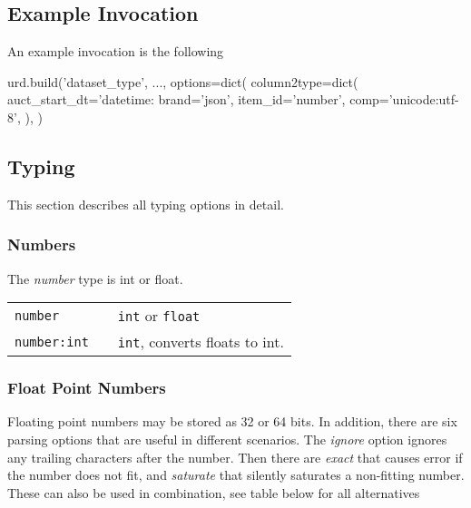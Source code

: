 


\subsection{Example Invocation}
An example invocation is the following

\begin{python}
urd.build('dataset_type', ...,
  options=dict(
    column2type=dict(
      auct_start_dt='datetime:%
      brand='json',
      item_id='number',
      comp='unicode:utf-8',
    ),
  )
\end{python}


\clearpage
\subsection{Typing}
This section describes all typing options in detail.

\subsubsection{Numbers}
The \emph{number} type is int or float.\\

\begin{tabular}{p{2cm}p{2cm}l}
  \texttt{number}     && \texttt{int} or \texttt{float}\\
  \texttt{number:int} && \texttt{int}, converts floats to int.\\
\end{tabular}



\subsubsection{Float Point Numbers}
Floating point numbers may be stored as 32 or 64 bits.  In addition,
there are six parsing options that are useful in different scenarios.
The \emph{ignore} option ignores any trailing characters after the
number.  Then there are \emph{exact} that causes error if the number
does not fit, and \emph{saturate} that silently saturates a
non-fitting number.  These can also be used in combination, see table
below for all alternatives\\


